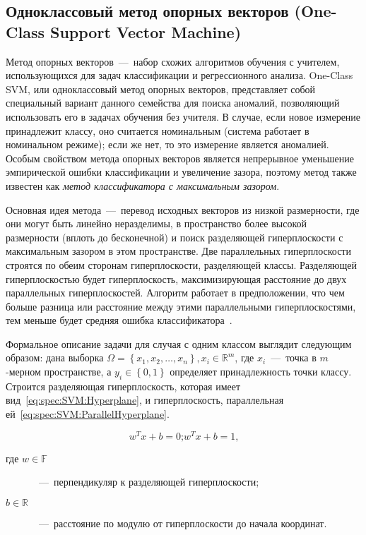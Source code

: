 \subsection{Одноклассовый метод опорных векторов (One-Class Support Vector Machine)}
Метод опорных векторов~---~набор схожих алгоритмов обучения с учителем, использующихся для задач классификации и регрессионного анализа. One-Class SVM, или одноклассовый метод опорных векторов, представляет собой специальный вариант данного семейства для поиска аномалий, позволяющий использовать его в задачах обучения без учителя. В случае, если новое измерение принадлежит классу, оно считается номинальным (система работает в номинальном режиме); если же нет, то это измерение является аномалией. Особым свойством метода опорных векторов является непрерывное уменьшение эмпирической ошибки классификации и увеличение зазора, поэтому метод также известен как \textit{метод классификатора с максимальным зазором}.

Основная идея метода~---~перевод исходных векторов из низкой размерности, где они могут быть линейно неразделимы, в пространство более высокой размерности (вплоть до бесконечной) и поиск разделяющей гиперплоскости с максимальным зазором в этом пространстве. Две параллельных гиперплоскости строятся по обеим сторонам гиперплоскости, разделяющей классы. Разделяющей гиперплоскостью будет гиперплоскость, максимизирующая расстояние до двух параллельных гиперплоскостей. Алгоритм работает в предположении, что чем больше разница или расстояние между этими параллельными гиперплоскостями, тем меньше будет средняя ошибка классификатора~\cite{LifshitsInternetAlgorithms}.

Формальное описание задачи для случая с одним классом выглядит следующим образом: дана выборка $\Omega = \left\{x_1,x_2,\dots,x_n\right\}, x_i\in {\mathbb{R}}^m$, где $x_i$~---~точка в $m$-мерном пространстве, а $y_i\in \left\{0,1\right\}$ определяет принадлежность точки классу. Строится разделяющая гиперплоскость, которая имеет вид~\eqref{eq:spec:SVM:Hyperplane}, и гиперплоскость, параллельная ей~\eqref{eq:spec:SVM:ParallelHyperplane}.

\begin{subequations}
\begin{equation} \label{eq:spec:SVM:Hyperplane}
w^T x + b = 0 \text{;}
\end{equation}
\begin{equation}\label{eq:spec:SVM:ParallelHyperplane}
w^T x + b = 1 \text{,}
\end{equation}
\end{subequations}
\begin{description}
	\item[где $w\in \mathbb{F}$]~---~перпендикуляр к разделяющей гиперплоскости;
	\item[$b\in \mathbb{R}$]~---~расстояние по модулю от гиперплоскости до начала координат.
\end{description}

